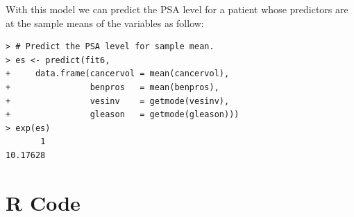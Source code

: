 \documentclass[12pt,letterpaper,titlepage,en-US]{article}
\begin{document}
With this model we can predict the PSA level for a patient whose predictors are at the sample means of the variables as follow:
\begin{lstlisting}
> # Predict the PSA level for sample mean.
> es <- predict(fit6,
+     data.frame(cancervol = mean(cancervol),
+                benpros   = mean(benpros),
+                vesinv    = getmode(vesinv),
+                gleason   = getmode(gleason)))
> exp(es)
       1
10.17628
\end{lstlisting}

\pagebreak

\section{R Code}


\end{document}
